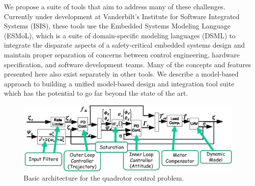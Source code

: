 We propose a suite of tools
that aim to address many of these challenges.  Currently under development at
Vanderbilt's Institute for Software Integrated Systems (ISIS), these 
tools use the Embedded Systems Modeling Language (ESMoL), which is a
suite of domain-specific modeling languages (DSML) to integrate the 
disparate aspects of a safety-critical embedded systems design and 
maintain proper separation of concerns between control engineering, hardware specification, and software 
development teams.  Many of the concepts and features presented here also 
exist separately in other tools.  We describe a model-based approach to building 
a unified model-based design and integration tool suite which has the potential to go 
far beyond the state of the art.

\begin{figure}
\centering
\includegraphics[width=0.8\columnwidth]{figures/quadrotor_arch.png}
    \caption{Basic architecture for the quadrotor control problem.}
    \label{fig:quadrotor}
\end{figure}

